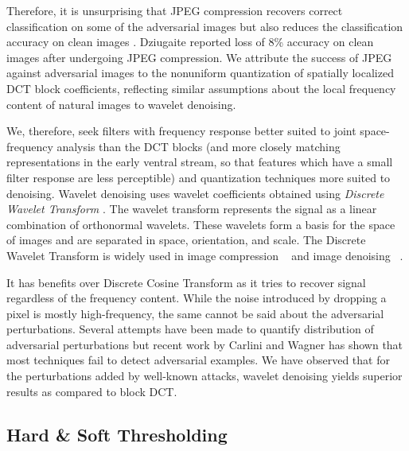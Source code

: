 Therefore, it is unsurprising that JPEG compression recovers correct classification on some of the adversarial images but  also reduces the classification accuracy on clean images \cite{Kurakin2016AdversarialEI,Das2017KeepingTB,Dziugaite2016ASO,CounteringAIGuo17}. 
Dziugaite \etal \cite{Dziugaite2016ASO} reported loss of $8$\% accuracy on clean images after undergoing JPEG compression. 
We attribute the success of JPEG against adversarial images to the nonuniform quantization of spatially localized DCT block coefficients, reflecting similar assumptions about the local frequency content of natural images to wavelet denoising.

We, therefore, seek filters with frequency response better suited to joint space-frequency analysis than the DCT blocks (and more closely matching representations in the early ventral stream, so that features which have a small filter response are less perceptible) and quantization techniques more suited to denoising. 
Wavelet denoising uses wavelet coefficients obtained using \textit{Discrete Wavelet Transform} \cite{DWTantonini1992image}.
The wavelet transform represents the signal as a linear combination of orthonormal wavelets.
These wavelets form a basis for the space of images and are separated in space, orientation, and scale.
The Discrete Wavelet Transform is widely used in image compression ~\cite{JPEG2000Adams2001} and image denoising ~\cite{BayesShrinkChang2000,WaveletDenoisingRangarajan2002,Simoncelli1999BayesianDO}.

It has benefits over Discrete Cosine Transform as it tries to recover signal regardless of the frequency content. 
While the noise introduced by dropping a pixel is mostly high-frequency, the same cannot be said about the adversarial perturbations.
Several attempts have been made to quantify distribution of adversarial perturbations \cite{DropoutFeinman2017,ForesightLin2017DetectingAA} but recent work by Carlini and Wagner \cite{EasilyDetectedCarlini2017} has shown that most techniques fail to detect adversarial examples.
We have observed that for the perturbations added by well-known attacks, wavelet denoising yields superior results as compared to block DCT. %

\subsection{Hard \& Soft Thresholding}


